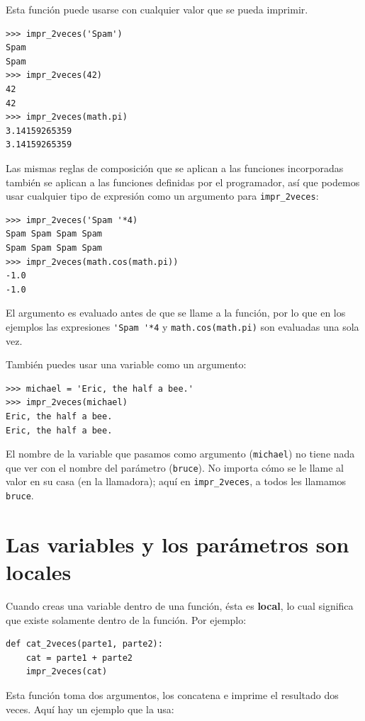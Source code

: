 \documentclass[10pt]{book}
\begin{document}
Esta función puede usarse con cualquier valor que se pueda imprimir.

\begin{verbatim}
>>> impr_2veces('Spam')
Spam
Spam
>>> impr_2veces(42)
42
42
>>> impr_2veces(math.pi)
3.14159265359
3.14159265359
\end{verbatim}
%
Las mismas reglas de composición que se aplican a las funciones incorporadas también
se aplican a las funciones definidas por el programador, así que podemos usar cualquier tipo de expresión
como un argumento para \verb"impr_2veces":

\begin{verbatim}
>>> impr_2veces('Spam '*4)
Spam Spam Spam Spam
Spam Spam Spam Spam
>>> impr_2veces(math.cos(math.pi))
-1.0
-1.0
\end{verbatim}
%
El argumento es evaluado antes de que se llame a la función, por lo que
en los ejemplos las expresiones \verb"'Spam '*4" y
{\tt math.cos(math.pi)} son evaluadas una sola vez.

También puedes usar una variable como un argumento:

\begin{verbatim}
>>> michael = 'Eric, the half a bee.'
>>> impr_2veces(michael)
Eric, the half a bee.
Eric, the half a bee.
\end{verbatim}
%
El nombre de la variable que pasamos como argumento ({\tt michael}) no tiene
nada que ver con el nombre del parámetro ({\tt bruce}).  No
importa cómo se le llame al valor en su casa (en la llamadora);
aquí en \verb"impr_2veces", a todos les llamamos {\tt bruce}.


\section{Las variables y los parámetros son locales}

Cuando creas una variable dentro de una función, ésta es {\bf local},
lo cual significa que existe
solamente dentro de la función.  Por ejemplo:

\begin{verbatim}
def cat_2veces(parte1, parte2):
    cat = parte1 + parte2
    impr_2veces(cat)
\end{verbatim}
%
Esta función toma dos argumentos, los concatena e imprime
el resultado dos veces.  Aquí hay un ejemplo que la usa:
\end{document}
